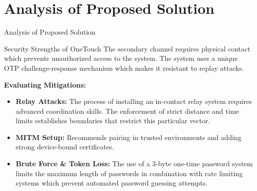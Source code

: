 \documentclass[aspectratio=169,t,xcolor=table]{beamer}
\begin{document}
\section{Analysis of Proposed Solution}
\begin{frame}{Analysis of Proposed Solution}
\vspace{-1em}
    \begin{block}{Security Strengths of OneTouch}
        The secondary channel requires physical contact which prevents unauthorized access to the system. The system uses a unique OTP challenge-response mechanism which makes it resistant to replay attacks.
    \end{block}
    
    \vspace{1em}
    
    \textbf{Evaluating Mitigations:}
    \begin{itemize}
        \item \textbf{Relay Attacks:} The process of installing an in-contact relay system requires advanced coordination skills. The enforcement of strict distance and time limits establishes boundaries that restrict this particular vector.
        \item \textbf{MITM Setup:} Recommends pairing in trusted environments and adding strong device-bound certificates.
        \item \textbf{Brute Force \& Token Loss:} The use of a 3-byte one-time password system limits the maximum length of passwords in combination with rate limiting systems which prevent automated password guessing attempts.
    \end{itemize}
\end{frame}
\end{document}
